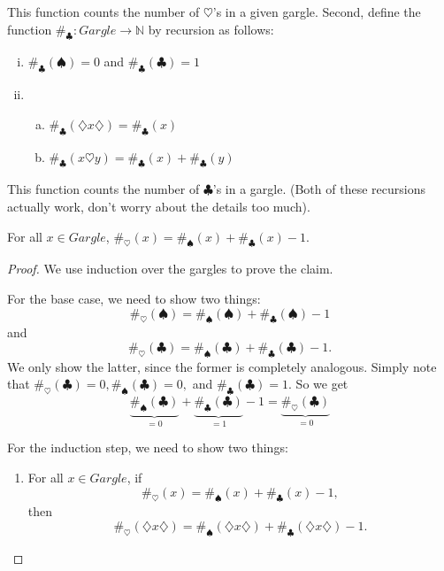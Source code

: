 \begin{enumerate}[{\thesection}.1]
\begin{enumerate}[(i)]
\begin{enumerate}[(a)]
		\end{enumerate}
	
	\end{enumerate}
	This function counts the number of $\heartsuit$'s in a given gargle. Second, define the function $\#_\clubsuit:Gargle\to\mathbb{N}$ by recursion as follows:
	\begin{enumerate}[(i)]
	
		\item $\#_\clubsuit(\spadesuit)=0$ and $\#_\clubsuit(\clubsuit)=1$
		
		\item \begin{enumerate}[(a)]

			\item $\#_\clubsuit(\diamondsuit x\diamondsuit)=\#_\clubsuit(x)$
			
			\item $\#_\clubsuit(x\heartsuit y)=\#_\clubsuit(x)+\#_\clubsuit(y)$

		\end{enumerate}
	
	\end{enumerate}
	This function counts the number of $\clubsuit$'s in a gargle. (Both of these recursions actually work, don't worry about the details too much).
	
		\begin{theorem}
		For all $x\in Gargle$, $\#_\heartsuit(x)=\#_\spadesuit(x)+\#_\clubsuit(x)-1$.
		\end{theorem}
			\begin{proof}
			We use induction over the gargles to prove the claim.
			
			For the base case, we need to show two things: \[\#_\heartsuit(\spadesuit)=\#_\spadesuit(\spadesuit)+\#_\clubsuit(\spadesuit)-1\] and \[\#_\heartsuit(\clubsuit)=\#_\spadesuit(\clubsuit)+\#_\clubsuit(\clubsuit)-1.\] We only show the latter, since the former is completely analogous. Simply note that $\#_\heartsuit(\clubsuit)=0,\#_\spadesuit(\clubsuit)=0,$ and $\#_\clubsuit(\clubsuit)=1$. So we get \[\underbrace{\#_\spadesuit(\clubsuit)}_{=0}+\underbrace{\#_\clubsuit(\clubsuit)}_{=1}-1=\underbrace{\#_\heartsuit(\clubsuit)}_{=0}\]
			
			For the induction step, we need to show two things:
			
			\begin{enumerate}[1.]
			
				\item For all $x\in Gargle$, if \[\#_\heartsuit(x)=\#_\spadesuit(x)+\#_\clubsuit(x)-1,\] then \[\#_\heartsuit(\diamondsuit x\diamondsuit )=\#_\spadesuit(\diamondsuit x\diamondsuit )+\#_\clubsuit(\diamondsuit x\diamondsuit )-1.\]
				

\end{enumerate}
\end{proof}
\end{enumerate}

